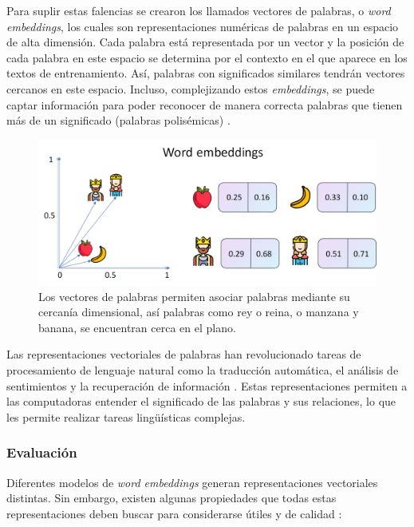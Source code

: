 Para suplir estas falencias se crearon los llamados vectores de palabras, o \textit{word embeddings}, los cuales son representaciones numéricas de palabras en un espacio de alta dimensión. Cada palabra está representada por un vector y la posición de cada palabra en este espacio se determina por el contexto en el que aparece en los textos de entrenamiento. Así, palabras con significados similares tendrán vectores cercanos en este espacio. Incluso, complejizando estos \textit{embeddings}, se puede captar información para poder reconocer de manera correcta palabras que tienen más de un significado (palabras polisémicas) \parencite{liu2020surveycontextualembeddings}.

\begin{figure}[H]
    \centering
    \includegraphics[width=1\textwidth]{imagenes/word_embeddings.png}
    \caption{Los vectores de palabras permiten asociar palabras mediante su cercanía dimensional, así palabras como rey o reina, o manzana y banana, se encuentran cerca en el plano.}
    \label{fig:word_embbeding}
\end{figure}

Las representaciones vectoriales de palabras han revolucionado tareas de procesamiento de lenguaje natural como la traducción automática, el análisis de sentimientos y la recuperación de información \parencite{sentimentanalysisspanishtweets}. Estas representaciones permiten a las computadoras entender el significado de las palabras y sus relaciones, lo que les permite realizar tareas lingüísticas complejas.

\subsubsection{Evaluación}

Diferentes modelos de \textit{word embeddings} generan representaciones vectoriales distintas. Sin embargo, existen algunas propiedades que todas estas representaciones deben buscar para considerarse útiles y de calidad \parencite{Wang_2019}:

